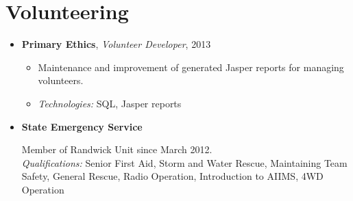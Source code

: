 
\vspace{-0.6cm}
\section*{Volunteering}
\vspace{-0.2cm}


\begin{itemize}
\item \textbf{Primary Ethics}, \textit{Volunteer Developer}, 2013
\begin{itemize}
  \item Maintenance and improvement of generated Jasper reports for 
  managing volunteers.
  \item \textit{Technologies:} SQL, Jasper reports
\end{itemize}

\item \textbf{State Emergency Service} \\ 
{\small
Member of Randwick Unit since March 2012.\\ 
\textit{Qualifications:} Senior First Aid, Storm and Water Rescue,
Maintaining Team Safety, General Rescue, Radio Operation, Introduction to AIIMS,
4WD Operation  
\par}

\end{itemize}
